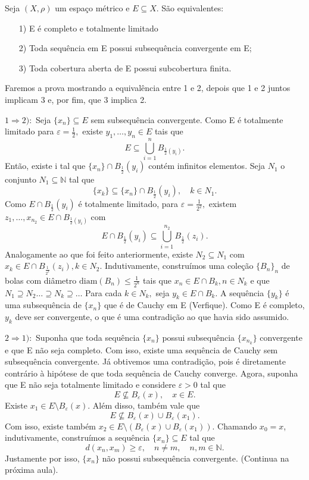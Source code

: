\documentclass[MetricSpaces/metric_notes.tex]{subfiles}
\begin{document}
\begin{theorem*}
	Seja \((X, \rho )\) um espaço métrico e \(E\subseteq{X}.\) São equivalentes:
	\begin{itemize}
		\item[1)]E é completo e totalmente limitado
		\item[2)] Toda sequência em E possui subsequência convergente em E;
		\item[3)] Toda cobertura aberta de E possui subcobertura finita.
	\end{itemize}
\end{theorem*}
\begin{proof*}
	Faremos a prova mostrando a equivalência entre 1 e 2, depois que 1 e 2 juntos implicam 3 e, por fim, que 3 implica 2.

	\(1 \Rightarrow 2):\) Seja \(\{x_{n}\}\subseteq{E}\) sem subsequência convergente. Como E é totalmente limitado para \(\varepsilon = \frac{1}{2},\) existe
	\(y_{1}, \dotsc, y_{n}\in E\) tais que
	\[
		E\subseteq{\bigcup_{i=1}^{n}{B_{\frac{1}{2}(y_{i})}}}.
	\]
	Então, existe i tal que \(\{x_{n}\}\cap B_{\frac{1}{2}}(y_{i})\) contém infinitos elementos. Seja \(N_{1}\) o conjunto \(N_{1}\subseteq{\mathbb{N}}\) tal que
	\[
		\{x_{k}\}\subseteq{\{x_{n}\}\cap B_{\frac{1}{2}}(y_{i}),}\quad k\in N_{1}.
	\]
	Como \(E\cap B_{\frac{1}{2}}(y_{i})\) é totalmente limitado, para \(\varepsilon = \frac{1}{2^{2}},\) existem \(z_{1}, \dotsc, x_{n_{2}}\in E\cap B_{\frac{1}{2}(y_{i})}\)
	com
	\[
		E\cap B_{\frac{1}{2}}(y_{i})\subseteq{\bigcup_{i=1}^{n_{2}}{B_{\frac{1}{2}}(z_{i})}}.
	\]
	Analogamente ao que foi feito anteriormente, existe \(N_{2}\subseteq{N_{1}}\) com \(x_{k}\in E\cap B_{\frac{1}{2^{2}}}(z_{i}), k \in N_{2}\). Indutivamente, construímos uma coleção
	\(\{B_{n}\}_{n}\) de bolas com diâmetro \(\mathrm{diam}(B_{n})\leq \frac{1}{2^{n}}\) tais que \(x_{n}\in E\cap B_{k}, n\in N_{k}\) e que \(N_{1}\supseteq{N_{2}}\dotsc \supseteq{N_{k}}\supseteq{\dotsc}\)
	Para cada \(k\in N_{k},\) seja \(y_{k}\in E\cap B_{k}.\) A sequência \(\{y_{k}\}\) é uma subsequência de \(\{x_{n}\}\) que é de Cauchy em E (Verfique). Como E é completo,
	\(y_{k}\) deve ser convergente, o que é uma contradição ao que havia sido assumido.

	\(2 \Rightarrow 1):\) Suponha que toda sequência \(\{x_{n}\}\) possui subsequência \(\{x_{n_{k}}\}\) convergente e que E não seja completo. Com isso, existe uma
	sequência de Cauchy sem subsequência convergente. Já obtivemos uma contradição, pois é diretamente contrário à hipótese de que toda sequência de Cauchy converge. Agora, suponha que E
	não seja totalmente limitado e considere \(\varepsilon >0\) tal que
	\[
		E\not\subseteq{B_{\varepsilon }(x)}, \quad x\in E.
	\]
	Existe \(x_{1}\in E\setminus{B_{\varepsilon }(x)}\). Além disso, também vale que
	\[
		E\not\subseteq{B_{\varepsilon }(x)\cup B_{\varepsilon }(x_{1})}.
	\]
	Com isso, existe também \(x_{2}\in E\setminus{(B_{\varepsilon }(x)\cup B_{\varepsilon }(x_{1}))}\). Chamando
	\(x_{0} = x\), indutivamente, construímos a sequência \(\{x_{n}\}\subseteq{E}\) tal que
	\[
		d(x_{n}, x_{m})\geq \varepsilon, \quad n\neq m,\quad n, m\in \mathbb{N}.
	\]
	Justamente por isso, \(\{x_{n}\}\) não possui subsequência convergente. (Continua na próxima aula).
\end{proof*}
\end{document}
